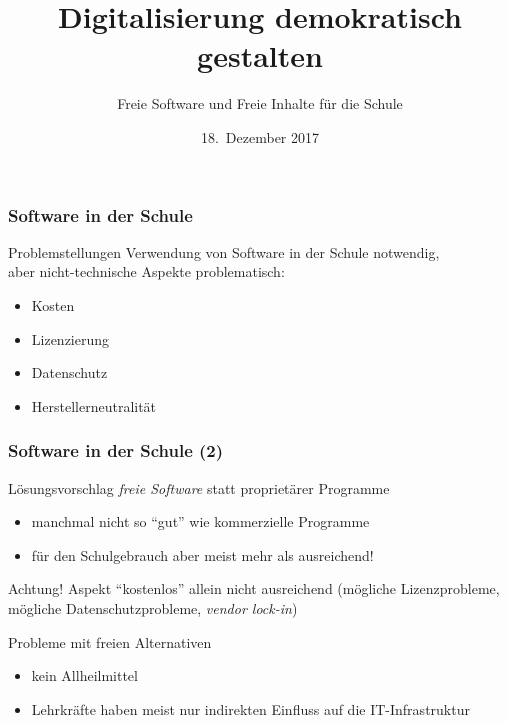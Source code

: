 \documentclass{beamer}
\date{18.~Dezember 2017}
\begin{document}
\title{Digitalisierung demokratisch gestalten}
\subtitle{Freie Software und Freie Inhalte für die Schule}

\maketitle

\begin{frame}
  \frametitle{Software in der Schule}

  \onslide<+->

  \begin{block}{Problemstellungen}
    Verwendung von Software in der Schule notwendig, \\
    aber nicht-technische Aspekte problematisch:
    \begin{itemize}
    \item Kosten
    \item Lizenzierung
    \item Datenschutz
    \item Herstellerneutralität
    \end{itemize}
  \end{block}
\end{frame}

\begin{frame}
  \frametitle{Software in der Schule (2)}

  \onslide<+->

  \begin{block}{Lösungsvorschlag}
    \emph{freie Software} statt proprietärer Programme
    \begin{itemize}
    \item manchmal nicht so \enquote{gut} wie kommerzielle Programme
    \item für den Schulgebrauch aber meist mehr als ausreichend!
    \end{itemize}
  \end{block}

  \onslide<+->

  \begin{block}{Achtung!}
    Aspekt \enquote{kostenlos} allein nicht ausreichend (mögliche
    Lizenzprobleme, mögliche Datenschutzprobleme, \emph{vendor
      lock-in})
  \end{block}

  \begin{block}{Probleme mit freien Alternativen}
    \begin{itemize}
    \item kein Allheilmittel
    \item Lehrkräfte haben meist nur indirekten Einfluss auf die
      IT-Infrastruktur
    \end{itemize}
  \end{block}
\end{frame}
\end{document}
